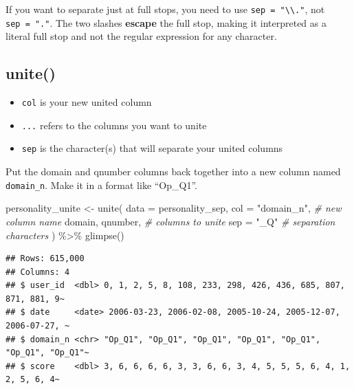 \documentclass[
  oneside]{book}
\newenvironment{Shaded}{\begin{snugshade}}{\end{snugshade}}
\newcommand{\AttributeTok}[1]{\textcolor[rgb]{0.77,0.63,0.00}{#1}}
\newcommand{\CommentTok}[1]{\textcolor[rgb]{0.56,0.35,0.01}{\textit{#1}}}
\newcommand{\FunctionTok}[1]{\textcolor[rgb]{0.00,0.00,0.00}{#1}}
\newcommand{\NormalTok}[1]{#1}
\newcommand{\OtherTok}[1]{\textcolor[rgb]{0.56,0.35,0.01}{#1}}
\newcommand{\SpecialCharTok}[1]{\textcolor[rgb]{0.00,0.00,0.00}{#1}}
\newcommand{\StringTok}[1]{\textcolor[rgb]{0.31,0.60,0.02}{#1}}
\providecommand{\tightlist}{%
  \setlength{\itemsep}{0pt}\setlength{\parskip}{0pt}}
\begin{document}
\begin{warning}
If you want to separate just at full stops, you need to use \texttt{sep\ =\ "\textbackslash{}\textbackslash{}."}, not \texttt{sep\ =\ "."}. The two slashes \textbf{escape} the full stop, making it interpreted as a literal full stop and not the regular expression for any character.

\end{warning}

\hypertarget{unite}{%
\subsection{unite()}\label{unite}}

\begin{itemize}
\tightlist
\item
  \texttt{col} is your new united column
\item
  \texttt{...} refers to the columns you want to unite
\item
  \texttt{sep} is the character(s) that will separate your united columns
\end{itemize}

Put the domain and qnumber columns back together into a new column named \texttt{domain\_n}. Make it in a format like ``Op\_Q1''.

\begin{Shaded}
\begin{Highlighting}[]
\NormalTok{personality\_unite }\OtherTok{\textless{}{-}} \FunctionTok{unite}\NormalTok{(}
  \AttributeTok{data =}\NormalTok{ personality\_sep, }
  \AttributeTok{col =} \StringTok{"domain\_n"}\NormalTok{, }\CommentTok{\# new column name}
\NormalTok{  domain, qnumber,  }\CommentTok{\# columns to unite}
  \AttributeTok{sep =} \StringTok{"\_Q"}        \CommentTok{\# separation characters}
\NormalTok{) }\SpecialCharTok{\%\textgreater{}\%}
  \FunctionTok{glimpse}\NormalTok{()}
\end{Highlighting}
\end{Shaded}

\begin{verbatim}
## Rows: 615,000
## Columns: 4
## $ user_id  <dbl> 0, 1, 2, 5, 8, 108, 233, 298, 426, 436, 685, 807, 871, 881, 9~
## $ date     <date> 2006-03-23, 2006-02-08, 2005-10-24, 2005-12-07, 2006-07-27, ~
## $ domain_n <chr> "Op_Q1", "Op_Q1", "Op_Q1", "Op_Q1", "Op_Q1", "Op_Q1", "Op_Q1"~
## $ score    <dbl> 3, 6, 6, 6, 6, 3, 3, 6, 6, 3, 4, 5, 5, 5, 6, 4, 1, 2, 5, 6, 4~
\end{verbatim}
\end{document}
